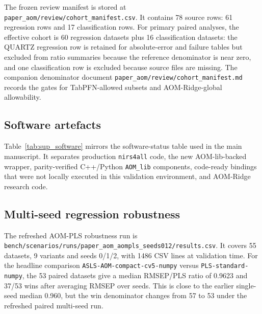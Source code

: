 \documentclass[11pt,a4paper]{article}
\newcommand{\code}[1]{\nolinkurl{#1}}
\begin{document}
The frozen review manifest is stored at
\code{paper_aom/review/cohort_manifest.csv}.  It contains 78 source rows:
61 regression rows and 17 classification rows.  For primary paired analyses,
the effective cohort is 60 regression datasets plus 16 classification
datasets: the QUARTZ regression row is retained for absolute-error and failure
tables but excluded from ratio summaries because the reference denominator is
near zero, and one classification row is excluded because source files are
missing.  The companion denominator document
\code{paper_aom/review/cohort_manifest.md} records the gates for TabPFN-allowed
subsets and AOM-Ridge-global allowability.

\subsection{Software artefacts}

Table~\ref{tab:sup_software} mirrors the software-status table used in the
main manuscript.  It separates production \code{nirs4all} code, the new
AOM-lib-backed wrapper, parity-verified C++/Python \code{AOM_lib} components,
code-ready bindings that were not locally executed in this validation
environment, and AOM-Ridge research code.

\begin{table}[h]
\centering
\caption{Software artefacts distributed with the AOM study.}
\label{tab:sup_software}
\small

\end{table}

\subsection{Multi-seed regression robustness}

The refreshed AOM-PLS robustness run is
\code{bench/scenarios/runs/paper_aom_aompls_seeds012/results.csv}.  It covers
55 datasets, 9 variants and seeds 0/1/2, with 1486 CSV lines at validation
time.  For the headline comparison
\code{ASLS-AOM-compact-cv5-numpy} versus \code{PLS-standard-numpy}, the 53
paired datasets give a median RMSEP/PLS ratio of 0.9623 and 37/53 wins after
averaging RMSEP over seeds.  This is close to the earlier single-seed median
0.960, but the win denominator changes from 57 to 53 under the refreshed
paired multi-seed run.
\end{document}
